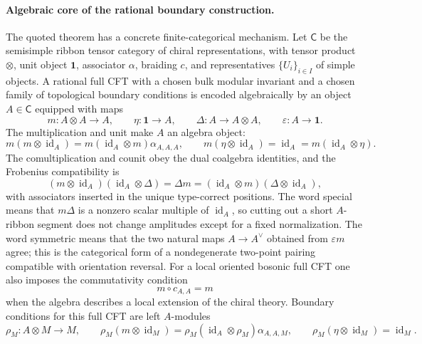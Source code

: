 \paragraph{Algebraic core of the rational boundary construction.}
The quoted theorem has a concrete finite-categorical mechanism.  Let
\(\mathsf C\) be the semisimple ribbon tensor category of chiral
representations, with tensor product \(\otimes\), unit object
\(\mathbf 1\), associator \(\alpha\), braiding \(c\), and representatives
\(\{U_i\}_{i\in I}\) of simple objects.  A rational full CFT with a chosen
bulk modular invariant and a chosen family of topological boundary
conditions is encoded algebraically by an object \(A\in\mathsf C\) equipped
with maps
\[
  m:A\otimes A\to A,\qquad
  \eta:\mathbf 1\to A,\qquad
  \Delta:A\to A\otimes A,\qquad
  \varepsilon:A\to\mathbf 1 .
\]
The multiplication and unit make \(A\) an algebra object:
\[
  m(m\otimes\operatorname{id}_A)
  =
  m(\operatorname{id}_A\otimes m)\alpha_{A,A,A},
  \qquad
  m(\eta\otimes\operatorname{id}_A)=\operatorname{id}_A
  =
  m(\operatorname{id}_A\otimes\eta).
\]
The comultiplication and counit obey the dual coalgebra identities, and the
Frobenius compatibility is
\begin{equation}
  (m\otimes\operatorname{id}_A)
  (\operatorname{id}_A\otimes\Delta)
  =
  \Delta m
  =
  (\operatorname{id}_A\otimes m)(\Delta\otimes\operatorname{id}_A),
  \label{eq:bcft-frobenius-identity-object}
\end{equation}
with associators inserted in the unique type-correct positions.  The word
special means that \(m\Delta\) is a nonzero scalar multiple of
\(\operatorname{id}_A\), so cutting out a short \(A\)-ribbon segment does not
change amplitudes except for a fixed normalization.  The word symmetric
means that the two natural maps \(A\to A^\vee\) obtained from
\(\varepsilon m\) agree; this is the categorical form of a nondegenerate
two-point pairing compatible with orientation reversal.  For a local
oriented bosonic full CFT one also imposes the commutativity condition
\[
  m\circ c_{A,A}=m
\]
when the algebra describes a local extension of the chiral theory.  Boundary
conditions for this full CFT are left \(A\)-modules
\[
  \rho_M:A\otimes M\to M,\qquad
  \rho_M(m\otimes\operatorname{id}_M)
  =
  \rho_M(\operatorname{id}_A\otimes\rho_M)\alpha_{A,A,M},
  \qquad
  \rho_M(\eta\otimes\operatorname{id}_M)=\operatorname{id}_M .
\]

